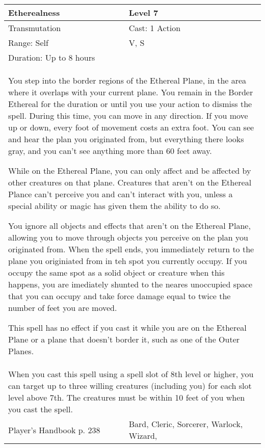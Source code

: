 \documentclass[11pt]{report}
\begin{document}
\begin{table}[H]
	\begin{tabular}{||p{6cm}|p{6cm}||}
		\hline\hline
		\bf{Etherealness} & Level 7\\ \hline
		Transmutation & Cast: 1 Action\\ \hline
		Range: Self & V, S\\ \hline
		Duration: Up to 8 hours & \\ \hline
		\multicolumn{2}{||p{12cm}||}{You step into the border regions of the Ethereal Plane, in the area where it overlaps with your current plane. You remain in the Border Ethereal for the duration or until you use your action to dismiss the spell. During this time, you can move in any direction. If you move up or down, every foot of movement costs an extra foot. You can see and hear the plan you originated from, but everything there looks gray, and you can’t see anything more than 60 feet away. 

While on the Ethereal Plane, you can only affect and be affected by other creatures on that plane. Creatures that aren’t on the Ethereal Plance can’t perceive you and can’t interact with you, unless a special ability or magic has given them the ability to do so. 

You ignore all objects and effects that aren’t on the Ethereal Plane, allowing you to move through objects you perceive on the plan you originated from. When the spell ends, you immediately return to the plane you originiated from in teh spot you currently occupy. If you occupy the same spot as a solid object or creature when this happens, you are imediately shunted to the neares unoccupied space that you can occupy and take force damage equal to twice the number of feet you are moved. 

This spell has no effect if you cast it while you are on the Ethereal Plane or a plane that doesn’t border it, such as one of the Outer Planes.}\\ \hline
		\multicolumn{2}{||p{12cm}||}{When you cast this spell using a spell slot of 8th level or higher, you can target up to three willing creatures (including you) for each slot level above 7th. The creatures must be within 10 feet of you when you cast the spell.}\\ \hline
Player's Handbook p. 238 & Bard, Cleric, Sorcerer, Warlock, Wizard, \\ \hline\hline
	\end{tabular}
\end{table}
\end{document}
